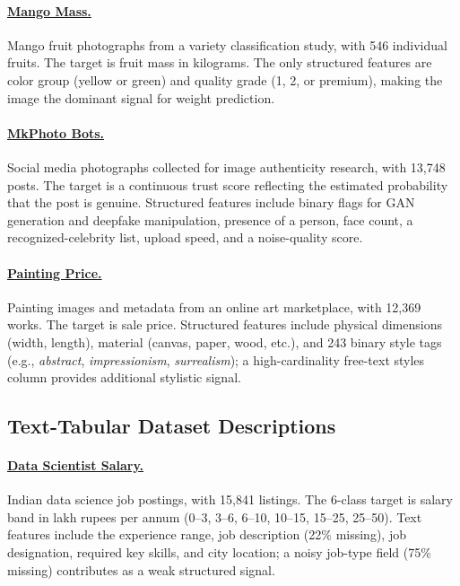 \documentclass{llmxive}
\begin{document}
\paragraph{\href{https://www.kaggle.com/datasets/saurabhshahane/mango-varieties-classification}{Mango Mass.}} Mango fruit photographs from a variety classification study, with 546 individual fruits.
The target is fruit mass in kilograms.
The only structured features are color group (yellow or green) and quality grade (1, 2, or premium), making the image the dominant signal for weight prediction.

\paragraph{\href{https://www.kaggle.com/datasets/guardeec/mkphoto2023}{MkPhoto Bots.}} Social media photographs collected for image authenticity research, with 13,748 posts.
The target is a continuous trust score reflecting the estimated probability that the post is genuine.
Structured features include binary flags for GAN generation and deepfake manipulation, presence of a person, face count, a recognized-celebrity list, upload speed, and a noise-quality score.

\paragraph{\href{https://www.kaggle.com/datasets/denozavrus/paintings-price-prediction}{Painting Price.}} Painting images and metadata from an online art marketplace, with 12,369 works.
The target is sale price.
Structured features include physical dimensions (width, length), material (canvas, paper, wood, etc.), and 243 binary style tags (e.g., \textit{abstract}, \textit{impressionism}, \textit{surrealism}); a high-cardinality free-text styles column provides additional stylistic signal.


\subsection{Text-Tabular Dataset Descriptions}

\paragraph{\href{https://www.openml.org/search?type=data&id=46664}{Data Scientist Salary.}} Indian data science job postings, with 15,841 listings.
The 6-class target is salary band in lakh rupees per annum (0--3, 3--6, 6--10, 10--15, 15--25, 25--50).
Text features include the experience range, job description (22\% missing), job designation, required key skills, and city location; a noisy job-type field (75\% missing) contributes as a weak structured signal.
\end{document}
